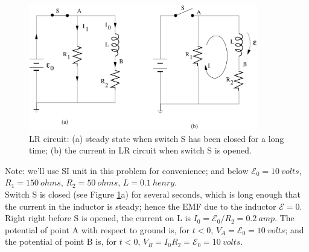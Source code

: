 \documentclass[makesolutionspdf]{esg8022pset}
\begin{document}
\begin{solution}


\begin{figure}[H]
    \centering
    \includegraphics[width = 10cm]{inductance2}
    \caption{LR circuit: (a) steady state when switch S has been closed for a
long time; (b) the current in LR circuit when switch S is opened.}
    \label{fig:inductance2.eps}
  \end{figure}




Note: we'll use SI unit in this problem for convenience; and below
${\mathcal{E}}_0=10\:volts$, $R_1=150\:ohms$, $R_2=50\:ohms$,
$L=0.1\:henry$.\\

Switch S is closed (see Figure \ref{fig:inductance2.eps}a) for several
seconds, which is long enough that the current in the inductor is
steady; hence the EMF due to the inductor ${\mathcal{E}}=0$.  Right
right before S is opened, the current on L is $I_0 =
{\mathcal{E}}_0/R_2 = 0.2\:amp$.  The potential of point A with
respect to ground is, for $t<0$, $V_A = {\mathcal{E}}_0 = 10\:volts$;
and the potential of point B is, for $t<0$, $V_B=I_0 R_2=
{\mathcal{E}}_0=10\:volts$.\\


\end{solution}
\end{document}
